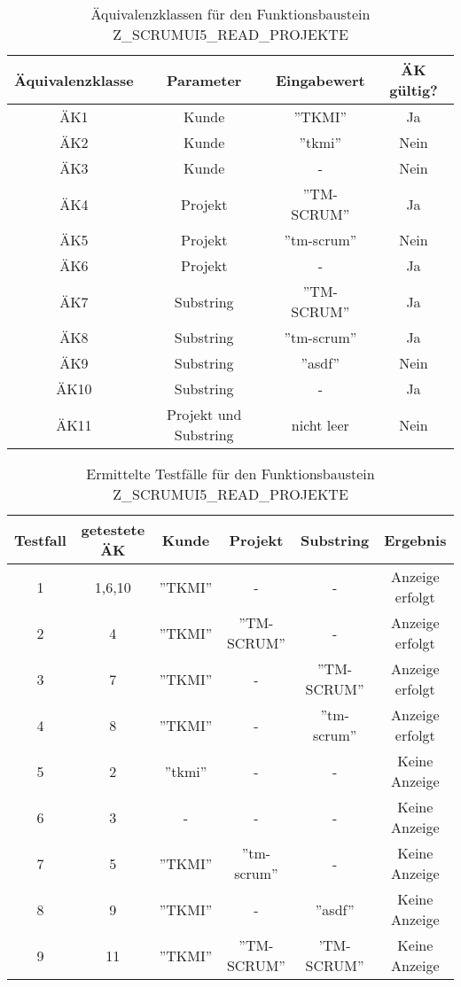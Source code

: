 \begin{table}[h]
	\centering
\begin{tabular}{cccc}
	\toprule Äquivalenzklasse & Parameter & Eingabewert & ÄK gültig?\\
	\midrule ÄK1 & Kunde  & ''TKMI''  & Ja\\ 
			ÄK2 & Kunde & ''tkmi'' & Nein\\
			ÄK3 & Kunde & - & Nein\\
			\midrule
			ÄK4 & Projekt & ''TM-SCRUM'' & Ja\\
			ÄK5 & Projekt & ''tm-scrum'' & Nein\\
			ÄK6 & Projekt & - & Ja\\
			\midrule
			ÄK7 & Substring & ''TM-SCRUM'' & Ja\\
			ÄK8 & Substring & ''tm-scrum'' & Ja\\
			ÄK9 & Substring & ''asdf'' & Nein\\
			ÄK10 & Substring & - & Ja\\
			\midrule
			ÄK11 & Projekt und Substring & nicht leer & Nein\\
	\bottomrule 
\end{tabular} 
\caption{Äquivalenzklassen für den Funktionsbaustein Z\_SCRUMUI5\_READ\_PROJEKTE}
\label{tab:aquivalenzklassen-FubaProjekte}
\end{table} 

\begin{table}[h]
	\centering
\begin{tabular}{cccccc}
	\toprule Testfall & getestete ÄK & Kunde 	& Projekt 		& Substring 	&  Ergebnis \\ 
	\midrule     1 	 &  1,6,10 		& ''TKMI'' 	& - 			& - 			&  Anzeige erfolgt\\ 
			 2 	 & 4			& ''TKMI'' 	&''TM-SCRUM'' & - 			& Anzeige erfolgt\\ 
			 3	 &  7			& ''TKMI'' 	& - 			& ''TM-SCRUM'' & Anzeige erfolgt\\ 
			 4	 &  8			& ''TKMI'' 	& - 			& ''tm-scrum''	& Anzeige erfolgt\\ 
			5 	 &  2			& ''tkmi'' 	& - 			& - 			& Keine Anzeige\\ 
			6 	 &  3			& - 		& - 			& - 			& Keine Anzeige\\ 
			7 	 &  5			& ''TKMI'' 	& ''tm-scrum''	& - 			& Keine Anzeige\\ 
			8 	 &  9			& ''TKMI'' 	& - 			& ''asdf'' 		& Keine Anzeige\\ 
			 9 	 & 11			& ''TKMI'' 	& ''TM-SCRUM''	& 'TM-SCRUM''		& Keine Anzeige\\ 
	\bottomrule 
\end{tabular} 
\caption{Ermittelte Testfälle für den Funktionsbaustein Z\_SCRUMUI5\_READ\_PROJEKTE}
\label{tab:test-read-projektet}
\end{table} 

